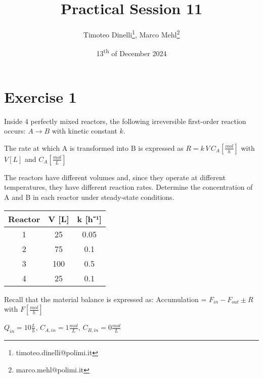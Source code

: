 \documentclass[oneside]{article}
\title{Practical Session 11}
\author{Timoteo Dinelli\footnote{timoteo.dinelli@polimi.it}, Marco Mehl\footnote{marco.mehl@polimi.it}}
\date{13\textsuperscript{th} of December 2024}
\begin{document}
\maketitle

\section*{Exercise 1}
Inside 4 perfectly mixed reactors, the following irreversible first-order reaction
occurs: $A \rightarrow B$ with kinetic constant $k$.

\noindent The rate at which A is transformed into B is expressed as $R = k \, V \, C_{A}
\left[\frac{mol}{h}\right]$ with $V[L]$ and $C_{A}\left[\frac{mol}{L}\right]$

\noindent The reactors have different volumes and, since they operate at different temperatures,
they have different reaction rates. Determine the concentration of A and B in each
reactor under steady-state conditions.

\begin{table}[h]
   \centering
   \begin{tabular}{|c|c|c|}
   \hline
   Reactor & V [L] & k [h⁻¹] \\
   \hline
   1 & 25 & 0.05 \\
   2 & 75 & 0.1 \\
   3 & 100 & 0.5 \\
   4 & 25 & 0.1 \\
   \hline
   \end{tabular}
\end{table}

Recall that the material balance is expressed as: Accumulation = $F_{in} - F_{out} \pm R$
with $F\left[\frac{mol}{h}\right]$

$Q_{in} = 10\frac{L}{h}$, \quad $C_{A,in} = 1\frac{mol}{L}$, \quad $C_{B,in} =
0\frac{mol}{L}$

\begin{center}
\end{center}
\end{document}
